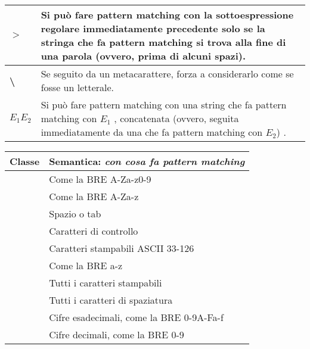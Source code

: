 \begin{center}
\begin{tabular}{|p{3cm}|p{10cm}|}
		\textbf{$>$}			& Si può fare pattern matching con la sottoespressione regolare immediatamente precedente solo se la stringa che fa pattern matching si trova alla fine di una parola (ovvero, prima di alcuni spazi). \\ \hline
		\textbf{\textbackslash}	& Se seguito da un metacarattere, forza a considerarlo come se fosse un letterale. \\ \hline
		\textbf{$E_{1}E_{2}$}		& Si può fare pattern matching con una string che fa 
		pattern matching con $ E_{1} $ , concatenata (ovvero, seguita immediatamente da una che fa pattern matching con $ E_{2} $) .\\ \hline
	\end{tabular}
\end{center}
\newpage
\begin{center}
     \label{tab:table-posix}
	\begin{tabular}{|l|l|}
	\hline
		\textbf{Classe} & \textbf{Semantica: \textit{con cosa fa pattern matching}} \\ \hline
		[:alnum:]	& Come la BRE A-Za-z0-9 \\ \hline
		[:alpha:]	& Come la BRE A-Za-z \\ \hline
		[:blank:]	& Spazio o tab \\ \hline
		[:cntrl:]	& Caratteri di controllo \\ \hline
		[:graph:]	& Caratteri stampabili ASCII 33-126 \\ \hline
		[:lower:]	& Come la BRE a-z \\ \hline
		[:print:]	& Tutti i caratteri stampabili \\ \hline
		[:space:]	& Tutti i caratteri di spaziatura \\ \hline
		[:xdigit:]	& Cifre esadecimali, come la BRE 0-9A-Fa-f \\ \hline
		[:digit:]	& Cifre decimali, come la BRE 0-9 \\ \hline
	\end{tabular}
\end{center}

